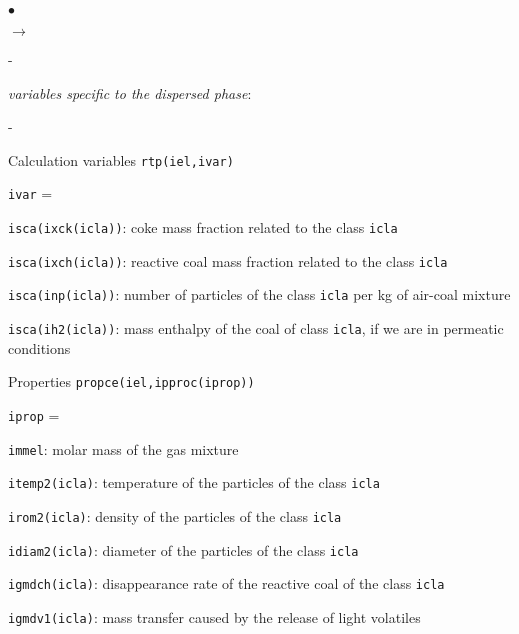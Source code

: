 {{{\begin{list}{$\bullet$}{}
\begin{list}{$\rightarrow$}{}
\begin{list}{}{}
\begin{list}{-}{}
                    \end{list}
              \item {\em variables specific to the dispersed phase}:
              \begin{list}{-}{}
               \item Calculation variables \texttt{rtp(iel,ivar)}
                     \begin{list}{\texttt{ivar} = }{}
                      \item \texttt{isca(ixck(icla))}: coke mass
                            fraction related to the class \texttt{icla}
                      \item \texttt{isca(ixch(icla))}: reactive coal
                            mass fraction related to the class \texttt{icla}
                      \item \texttt{isca(inp(icla))}: number of
                            particles of the class \texttt{icla} per kg of
                            air-coal mixture
                      \item \texttt{isca(ih2(icla))}: mass enthalpy of
                            the coal of class \texttt{icla}, if we are in
                            permeatic conditions
                     \end{list}
               \item Properties \texttt{propce(iel,ipproc(iprop))}
                     \begin{list}{\texttt{iprop} = }{}
                      \item \texttt{immel}: molar mass of the gas mixture
                      \item \texttt{itemp2(icla)}: temperature of
                            the particles of the class \texttt{icla}
                      \item \texttt{irom2(icla)}: density of
                            the particles of the class \texttt{icla}
                      \item \texttt{idiam2(icla)}: diameter of the
                            particles of the class \texttt{icla}
                      \item \texttt{igmdch(icla)}: disappearance
                            rate of the reactive coal of the class \texttt{icla}
                      \item \texttt{igmdv1(icla)}: mass transfer
                            caused by the release of light volatiles

\end{list}
\end{list}
\end{list}
\end{list}
\end{list}}}}
